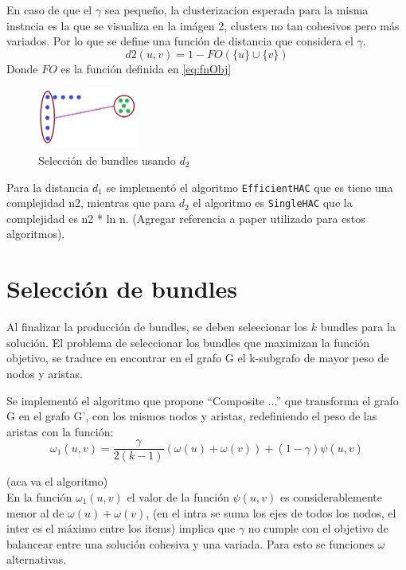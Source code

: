 En caso de que el $\gamma$ sea pequeño, la 
clusterizacion esperada para la misma instncia es la que se visualiza en la imágen 2, clusters no tan cohesivos pero más variados.
Por lo que se define una función de distancia que considera el $\gamma$.\\
\begin{equation}
d2(u,v) = 1 - FO(\{u\} \cup \{v\})
\end{equation}
Donde $FO$ es la función definida en \eqref{eq:fnObj} \\

\begin{figure}[H]
  \centering
    \includegraphics[width=0.3\textwidth]{img/cluster1.png}
  \caption{Selección de bundles usando $d_{2}$}
  \label{res:img-usingSingleHAC}
\end{figure}

Para la distancia $d_{1}$ se implementó el algoritmo \texttt{EfficientHAC} que es tiene una complejidad n2,
mientras que para $d_{2}$ el algoritmo es \texttt{SingleHAC} que la complejidad es n2 * ln n.
(Agregar referencia a paper utilizado para estos algoritmos).


\section{Selección de bundles}
Al finalizar la producción de bundles, se deben seleecionar los $k$ bundles para la solución.
El problema de seleccionar los bundles que maximizan la función objetivo, se traduce en 
encontrar en el grafo G el k-subgrafo de mayor peso de nodos y aristas.

Se implementó el algoritmo que propone ``Composite ...'' que transforma el grafo G 
en el grafo G', con los mismos nodos y aristas, redefiniendo el peso de las aristas con la función:\\

\begin{equation}
\omega_{1}(u,v) = \dfrac{\gamma}{2( k - 1)} (\omega(u) + \omega(v)) + (1 - \gamma)\psi(u,v) 
\end{equation}

(aca va el algoritmo)\\

En la función $\omega_{1}(u,v)$ el valor de la función $\psi(u,v)$  es considerablemente menor al de
$\omega(u) + \omega(v)$, (en el intra se suma los ejes de todos los nodos, el inter es el máximo entre los items)
implica que $\gamma$ no cumple con el objetivo de balancear entre una solución cohesiva y una variada.
Para esto se funciones $\omega$ alternativas.\\

